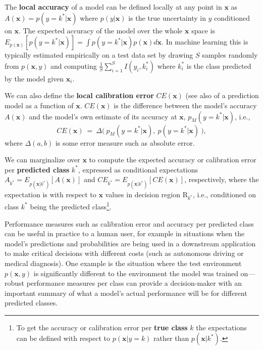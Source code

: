 \documentclass{article}
\newcommand{\ux}{{\mathbf{x}}}
\newcommand{\robby}[1]{\textcolor{Red}{[#1]\textsubscript{Robby}}}
\begin{document}
The {\bf local accuracy} of a model can be defined locally at any point in $\ux$ as $A(\ux) = p(y = k^*| \ux)$ where $p(y | \ux)$ is the true uncertainty in $y$ conditioned on $\ux$.
The expected accuracy of the model over the whole $\ux$ space is $E_{p(\ux)}[p(y = k^*| \ux)] = \int p(y = k^*| \ux) p(\ux) d\ux$.
In machine learning this is typically estimated empirically on a test data set by drawing $S$ samples randomly from $p(\ux,y)$ and computing $\frac{1}{S} \sum_{i=1}^S I(y_i, k_i^*)$ where $k_i^*$ is the class predicted by the model given $\ux_i$.

We can also define the {\bf local calibration error} $CE(\ux)$ (see also \cite{vaicenavicius19a} of a prediction model as a function of $\ux$.
$CE(\ux)$ is the difference between the model's accuracy $A(\ux)$ and the model's own estimate of its accuracy at $\ux$, $p_M(y = k^*| \ux)$, i.e.,
\[
    CE(\ux) \ = \  \Delta\bigl(\ p_M(y = k^*| \ux), \  p(y =k^*| \ux) \  \bigr),
\]
where $\Delta(a,b)$ is some error measure such as absolute error. %

We can marginalize over $\ux$ to compute the expected accuracy or calibration error per {\bf predicted class} $k^*$, expressed as conditional expectations $A_{k^*}  = E_{p(\ux|k^*)}[A(\ux)]$ and $CE_{k^*} = E_{p(\ux|k^*)}[ CE(\ux)]$, respectively, where the expectation is with respect to $\ux$ values in decision region $\mbox{R}_{k^*}$, i.e., conditioned on class $k^* $ being the predicted class\footnote{To get the accuracy or calibration error per {\bf true class} $k$ the expectations can be defined with respect to $p(\ux | y = k)$  rather than $p(\ux|k^*)$.}.

Performance measures such as calibration error and accuracy per predicted class can be useful in practice to a human user, for example in situations  when the model's predictions and probabilities are being used in a downstream application to make critical decisions with different costs (such as autonomous driving or medical diagnosis).
One example is the situation where the test environment $p(\ux,y)$ is significantly different to the environment the model was trained on---robust performance measures per class can provide a decision-maker with an important summary of what a model's actual performance will be for different predicted classes. 
\end{document}

